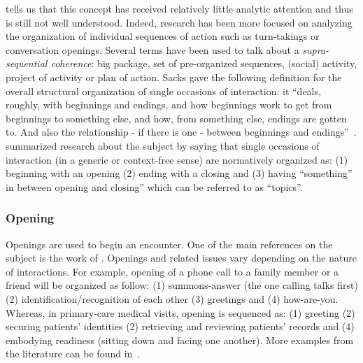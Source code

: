 \documentclass[a4paper,11pt,twoside]{StyleThese}
\begin{document}
\cite{robinson_overall_2012} tells us that this concept has received relatively little analytic attention and thus is still not well understood. Indeed, research has been more focused on analyzing the organization of individual sequences of action such as turn-takings or conversation openings. Several terms have been used to talk about a \emph{supra-sequential coherence}: big package, set of pre-organized sequences, (social) activity, project of activity or plan of action. Sacks gave the following definition for the overall structural organization of single occasions of interaction: it ``deals, roughly, with beginnings and endings, and how beginnings work to get from beginnings to something else, and how, from something else, endings are gotten to. And also the relationship - if there is one - between beginnings and endings''~\citep[p.~157]{sacks_lectures_1995}. \cite{robinson_overall_2012} summarized research about the subject by saying that single occasions of interaction (in a generic or context-free sense) are normatively organized as: (1) beginning with an opening (2) ending with a closing and (3) having ``something'' in between opening and closing'' which can be referred to as ``topics''.

\subsubsection{Opening}
Openings are used to begin an encounter. One of the main references on the subject is the work of \cite{schegloff_1986_routine}. Openings and related issues vary depending on the nature of interactions. For example, opening of a phone call to a family member or a friend will be organized as follow: (1) summons-answer (the one calling talks first) (2) identification/recognition of each other (3) greetings and (4) how-are-you. Whereas, in primary-care medical visits, opening is sequenced as: (1) greeting (2) securing patients’ identities (2) retrieving and reviewing patients’ records and (4) embodying readiness (sitting down and facing one another). More examples from the literature can be found in~\citep{robinson_overall_2012}. 
\end{document}
